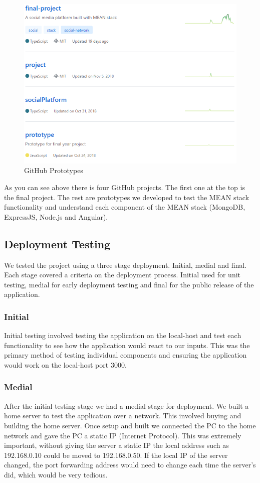 \begin{figure}[H]
  \includegraphics[width=\linewidth]{img/prototypes.PNG}
  \caption{GitHub Prototypes}
  \label{fig:GHP}
\end{figure}

As you can see above there is four GitHub projects. The first one at the top is the final project. The rest are prototypes we developed to test the MEAN stack functionality and understand each component of the MEAN stack (MongoDB, ExpressJS, Node.js and Angular).

\subsection{Deployment Testing}
We tested the project using a three stage deployment. Initial, medial and final. Each stage covered a criteria on the deployment process. Initial used for unit testing, medial for early deployment testing and final for the public release of the application.

\subsubsection{Initial}
Initial testing involved testing the application on the local-host and test each functionality to see how the application would react to our inputs. This was the primary method of testing individual components and ensuring the application would work on the local-host port 3000.

\subsubsection{Medial}
After the initial testing stage we had a medial stage for deployment. We built a home server to test the application over a network. This involved buying and building the home server. Once setup and built we connected the PC to the home network and gave the PC a static IP (Internet Protocol). This was extremely important, without giving the server a static IP the local address such as 192.168.0.10 could be moved to 192.168.0.50. If the local IP of the server changed, the port forwarding address would need to change each time the server's did, which would be very tedious. 

